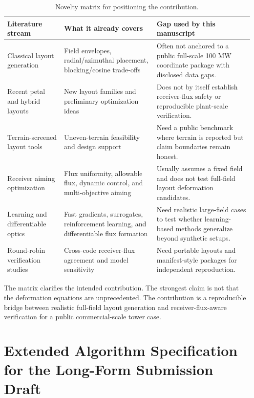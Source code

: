 \documentclass[final,3p,times]{elsarticle}
\begin{document}
\begin{longtable}{p{}p{}p{}}
\caption{Novelty matrix for positioning the contribution.} \label{tab:novelty-matrix}\\
\toprule
Literature stream & What it already covers & Gap used by this manuscript \\
\midrule
Classical layout generation & Field envelopes, radial/azimuthal placement, blocking/cosine trade-offs & Often not anchored to a public full-scale 100 MW coordinate package with disclosed data gaps. \\
Recent petal and hybrid layouts & New layout families and preliminary optimization ideas & Does not by itself establish receiver-flux safety or reproducible plant-scale verification. \\
Terrain-screened layout tools & Uneven-terrain feasibility and design support & Need a public benchmark where terrain is reported but claim boundaries remain honest. \\
Receiver aiming optimization & Flux uniformity, allowable flux, dynamic control, and multi-objective aiming & Usually assumes a fixed field and does not test full-field layout deformation candidates. \\
Learning and differentiable optics & Fast gradients, surrogates, reinforcement learning, and differentiable flux formation & Need realistic large-field cases to test whether learning-based methods generalize beyond synthetic setups. \\
Round-robin verification studies & Cross-code receiver-flux agreement and model sensitivity & Need portable layouts and manifest-style packages for independent reproduction. \\
\bottomrule
\end{longtable}

The matrix clarifies the intended contribution. The strongest claim is not that the deformation equations are unprecedented. The contribution is a reproducible bridge between realistic full-field layout generation and receiver-flux-aware verification for a public commercial-scale tower case.

\section{Extended Algorithm Specification for the Long-Form Submission Draft}
\end{document}
